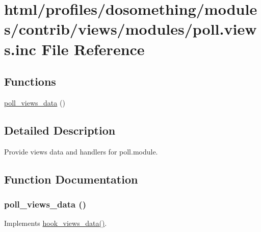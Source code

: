\hypertarget{poll_8views_8inc}{
\section{html/profiles/dosomething/modules/contrib/views/modules/poll.views.inc File Reference}
\label{poll_8views_8inc}
}
\subsection*{Functions}
\begin{DoxyCompactItemize}
\item 
\hyperlink{poll_8views_8inc_a02ad941a7e05ae1fe142ac35ad3ccb19}{poll\_\-views\_\-data} ()
\end{DoxyCompactItemize}


\subsection{Detailed Description}
Provide views data and handlers for poll.module. 

\subsection{Function Documentation}
\hypertarget{poll_8views_8inc_a02ad941a7e05ae1fe142ac35ad3ccb19}{
\subsubsection[{poll\_\-views\_\-data}]{\setlength{\rightskip}{0pt plus 5cm}poll\_\-views\_\-data ()}}
\label{poll_8views_8inc_a02ad941a7e05ae1fe142ac35ad3ccb19}
Implements \hyperlink{group__views__hooks_ga227057901681e4a33e33c199c7a8c989}{hook\_\-views\_\-data()}. 